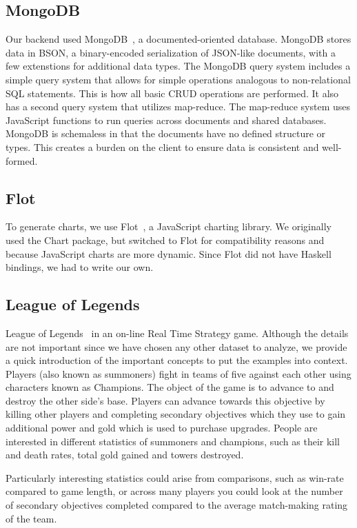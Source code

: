 \documentclass[letterpaper,twocolumn,9pt]{article}
\begin{document}
\subsection{MongoDB}

Our backend used MongoDB~\cite{mongo}, a documented-oriented database. MongoDB stores data in BSON, a binary-encoded serialization of JSON-like documents, with a few extenstions for additional data types.  The MongoDB query system includes a simple query system that allows for simple operations analogous to non-relational SQL statements.  This is how all basic CRUD operations are performed.  It also has a second query system that utilizes map-reduce.  The map-reduce system uses JavaScript functions to run queries across documents and shared databases.  MongoDB is schemaless in that the documents have no defined structure or types.  This creates a burden on the client to ensure data is consistent and well-formed.

\subsection{Flot}

To generate charts, we use Flot~\cite{flot}, a JavaScript charting library. We originally used the Chart package, but switched to Flot for compatibility reasons and because JavaScript charts are more dynamic. Since Flot did not have Haskell bindings, we had to write our own. 

\subsection{League of Legends}

League of Legends~\cite{lol} in an on-line Real Time Strategy game. Although the details are not important since we have chosen any other dataset to analyze, we provide a quick introduction of the important concepts to put the examples into context. Players (also known as summoners) fight in teams of five against each other using characters known as Champions. The object of the game is to advance to and destroy the other side's base. Players can advance towards this objective by killing other players and completing secondary objectives which they use to gain additional power and gold which is used to purchase upgrades. People are interested in different statistics of summoners and champions, such as their kill and death rates, total gold gained and towers destroyed.

Particularly interesting statistics could arise from comparisons, such as win-rate compared to game length, or across many players you could look at the number of secondary objectives completed compared to the average match-making rating of the team.
\end{document}
